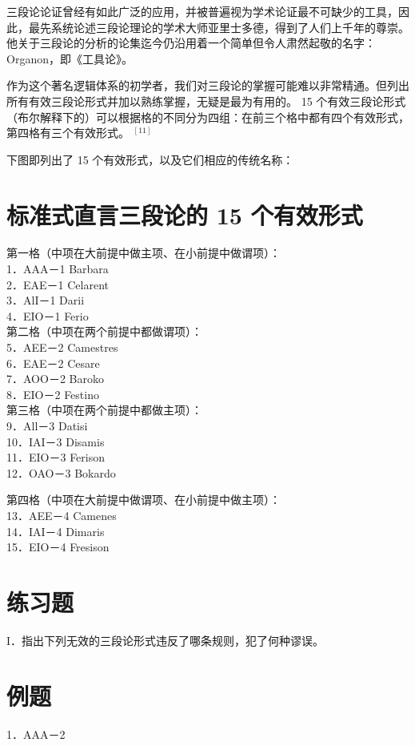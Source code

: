 三段论论证曾经有如此广泛的应用，并被普遍视为学术论证最不可缺少的工具，因此，最先系统论述三段论理论的学术大师亚里士多德，得到了人们上千年的尊崇。他关于三段论的分析的论集迄今仍沿用着一个简单但令人肃然起敬的名字：Organon，即《工具论》。

作为这个著名逻辑体系的初学者，我们对三段论的掌握可能难以非常精通。但列出所有有效三段论形式并加以熟练掌握，无疑是最为有用的。 15 个有效三段论形式（布尔解释下的）可以根据格的不同分为四组：在前三个格中都有四个有效形式，第四格有三个有效形式。 ${ }^{[11]}$

下图即列出了 15 个有效形式，以及它们相应的传统名称：

\section*{标准式直言三段论的 15 个有效形式}
第一格（中项在大前提中做主项、在小前提中做谓项）：\\
1．AAA－1 Barbara\\
2．EAE－1 Celarent\\
3．AlI－1 Darii\\
4．EIO－1 Ferio\\
第二格（中项在两个前提中都做谓项）：\\
5．AEE－2 Camestres\\
6．EAE－2 Cesare\\
7．AOO－2 Baroko\\
8．EIO－2 Festino\\
第三格（中项在两个前提中都做主项）：\\
9．All－3 Datisi\\
10．IAI－3 Disamis\\
11．EIO－3 Ferison\\
12．OAO－3 Bokardo

第四格（中项在大前提中做谓项、在小前提中做主项）：\\
13．AEE－4 Camenes\\
14．IAI－4 Dimaris\\
15．EIO－4 Fresison

\section*{练习题}
I．指出下列无效的三段论形式违反了哪条规则，犯了何种谬误。

\section*{例题}
1．AAA－2

